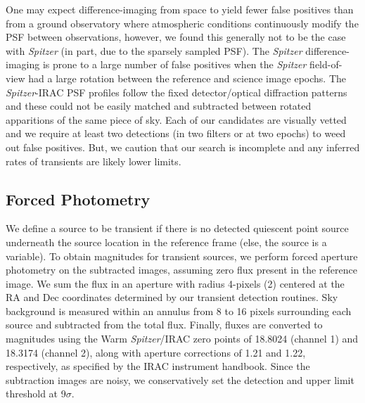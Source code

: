 \documentclass[twocolumn,times]{aastex6}
\begin{document}
One may expect difference-imaging from space to yield fewer false positives than from a ground observatory where atmospheric conditions continuously modify the PSF between observations, however, we found this generally not to be the case with {\it Spitzer} (in part, due to the sparsely sampled PSF). The {\it Spitzer} difference-imaging is prone to a large number of false positives when the {\it Spitzer} field-of-view had a large rotation between the reference and science image epochs. The {\it Spitzer}-IRAC PSF profiles follow the fixed detector/optical diffraction patterns and these could not be easily matched and subtracted between rotated apparitions of the same piece of sky. Each of our candidates are visually vetted and we require at least two detections (in two filters or at two epochs) to weed out false positives. But, we caution that our search is incomplete and any inferred rates of transients are likely lower limits.  
 
\subsection{Forced Photometry}
We define a source to be transient if there is no detected quiescent point source underneath the source location in the reference frame (else, the source is a variable). To obtain magnitudes for transient sources, we perform forced aperture photometry on the subtracted images, assuming
zero flux present in the reference image. We sum the flux in an aperture with radius 4-pixels (2) centered at the RA and Dec coordinates
determined by our transient detection routines. Sky background is measured within an annulus from 8 to 16 pixels
surrounding each source and subtracted from the total flux. Finally, fluxes are converted to magnitudes using the Warm {\it Spitzer}/IRAC
zero points of 18.8024 (channel 1) and 18.3174 (channel 2), along with aperture corrections of 1.21 and 1.22, respectively, as specified
by the IRAC instrument handbook. Since the subtraction images are noisy, we conservatively set the detection and upper limit threshold at 9$\sigma$. 
\end{document}
